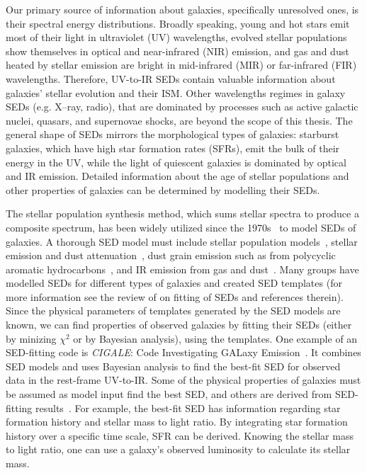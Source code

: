 Our primary source of information about galaxies, specifically unresolved ones, is their spectral energy distributions. 
Broadly speaking, young and hot stars emit most of their light in ultraviolet (UV) wavelengths, evolved stellar populations show themselves in optical and near-infrared (NIR) emission, and gas and dust heated by stellar emission are bright in mid-infrared (MIR) or far-infrared (FIR) wavelengths.
Therefore, UV-to-IR SEDs contain valuable information about galaxies' stellar evolution and their ISM. 
Other wavelengths regimes in galaxy SEDs (e.g. X--ray, radio), that are dominated by processes such as active galactic nuclei, quasars, and supernovae shocks, are beyond the scope of this thesis.
The general shape of SEDs mirrors the morphological types of galaxies: starburst galaxies, which have high star formation rates (SFRs), emit the bulk of their energy in the UV, while the light of quiescent galaxies is dominated by optical and IR emission. 
Detailed information about the age of stellar populations and other properties of galaxies can be determined by modelling their SEDs.

The stellar population synthesis method, which sums stellar spectra to produce a composite spectrum, has been widely utilized since the 1970s~\citep[e.g.][]{Tinsley72,Searle73} to model SEDs of galaxies.
A thorough SED model must include stellar population models~\citep[e.g.][]{Bruzual93,Bruzual03,Maraston05}, stellar emission and dust attenuation~\citep[e.g.][]{Calzetti00,Dopita05}, dust grain emission such as from polycyclic aromatic hydrocarbons~\citep[PAHs; e.g.][and references therein]{Tielens08}, and IR emission from gas and dust~\citep[e.g.][]{Chary01,Dale02,Lagache03,Lagache04,Smith07a,Draine07}.
Many groups have modelled SEDs for different types of galaxies and created SED templates (for more information see the review of \cite{Walcher11} on fitting of SEDs and references therein).
Since the physical parameters of templates generated by the SED models are known, we can find properties of observed galaxies by fitting their SEDs (either by minizing $\chi^2$ or by Bayesian analysis), using the templates.
One example of an SED-fitting code is {\em CIGALE}: Code Investigating GALaxy Emission~\citep{Noll09}.
It combines SED models and uses Bayesian analysis to find the best-fit SED for observed data in the rest-frame UV-to-IR.
Some of the physical properties of galaxies must be assumed as model input find the best SED, and others are derived from SED-fitting results~\citep[see ][for more detail]{Walch08}.
For example, the best-fit SED has information regarding star formation history and stellar mass to light ratio.
By integrating star formation history over a specific time scale, SFR can be derived. %
Knowing the stellar mass to light ratio, one can use a galaxy's observed luminosity to calculate its stellar mass.

